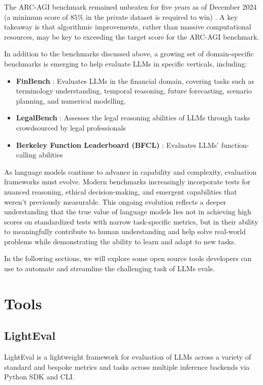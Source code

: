 The ARC-AGI benchmark remained unbeaten for five years as of December 2024 (a minimum score of $85\%$ in the private dataset is required to win) . A key takeaway is that algorithmic improvements, rather than massive computational resources, may be key to exceeding the target score for the ARC-AGI benchmark.

In addition to the benchmarks discussed above, a growing set of domain-specific benchmarks is emerging to help evaluate LLMs in specific verticals, including:
\begin{itemize}
    \item \textbf{FinBench} : Evaluates LLMs in the financial domain, covering tasks such as terminology understanding, temporal reasoning, future forecasting, scenario planning, and numerical modelling.
    \item \textbf{LegalBench} : Assesses the legal reasoning abilities of LLMs through tasks crowdsourced by legal professionals
    \item \textbf{Berkeley Function Leaderboard (BFCL)} : Evaluates LLMs' function-calling abilities
\end{itemize}

As language models continue to advance in capability and complexity, evaluation frameworks must evolve. Modern benchmarks increasingly incorporate tests for nuanced reasoning, ethical decision-making, and emergent capabilities that weren't previously measurable. This ongoing evolution reflects a deeper understanding that the true value of language models lies not in achieving high scores on standardized tests with narrow task-specific metrics, but in their ability to meaningfully contribute to human understanding and help solve real-world problems while demonstrating the ability to learn and adapt to new tasks.

In the following sections, we will explore some open source tools developers can use to automate and streamline the challenging task of LLMs evals.
\section{Tools}

\subsection{LightEval}

LightEval  is a lightweight framework for evaluation of LLMs across a variety of standard and bespoke metrics and tasks across multiple inference backends via Python SDK and CLI.

